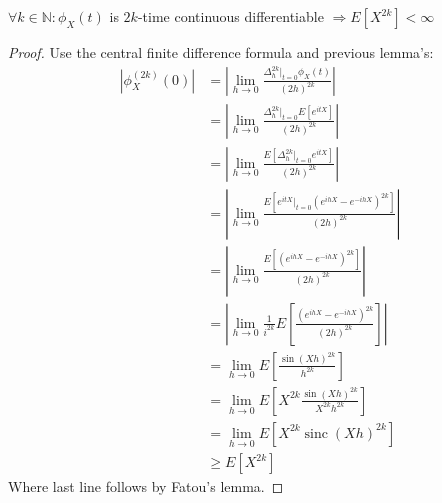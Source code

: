 \documentclass[a4paper,12pt]{article}
\begin{document}
\begin{lemma}
    $\forall k \in  \mathbb{N}:\phi_{X}(t)$ is $2k$-time continuous differentiable $\Rightarrow  E[X^{2k}] < \infty$
\end{lemma}

\begin{proof}
    Use the central finite difference formula and previous lemma's:
    \begin{align}
        |\phi_{X}^{(2k)}(0)| & = \left|\lim_{h \to 0} \frac{\Delta^{2k}_{h}|_{t=0} \phi_{X}(t)}{(2h)^{2k}}\right|                      \\
                             & = \left|\lim_{h \to 0} \frac{\Delta^{2k}_{h}|_{t=0} E\left[e^{itX}\right]}{(2h)^{2k}}\right|            \\
                             & = \left|\lim_{h \to 0} \frac{ E\left[\Delta^{2k}_{h}|_{t=0}e^{itX}\right]}{(2h)^{2k}}\right|            \\
                             & = \left|\lim_{h \to 0} \frac{ E\left[e^{itX} |_{t=0} (e^{ihX}-e^{-ihX})^{2k}\right]}{(2h)^{2k}}\right|  \\
                             & = \left|\lim_{h \to 0} \frac{ E\left[(e^{ihX}-e^{-ihX})^{2k}\right]}{(2h)^{2k}}\right|                  \\
                             & = \left|\lim_{h \to 0} \frac{1}{i^{2k}}E\left[\frac{ (e^{ihX}-e^{-ihX})^{2k}}{(2h)^{2k}} \right]\right| \\
                             & = \lim_{h \to 0} E\left[\frac{ \sin(Xh)^{2k}}{h^{2k}}\right]                                            \\
                             & = \lim_{h \to 0} E\left[ X^{2k}\frac{ \sin(Xh)^{2k}}{X^{2k} h^{2k}}\right]                              \\
                             & = \lim_{h \to 0} E\left[ X^{2k} \operatorname{sinc}(Xh) ^{2k}\right]                                    \\
                             & \ge  E\left[ X^{2k} \right]
    \end{align}
    Where last line follows by Fatou's lemma.
\end{proof}
\end{document}

